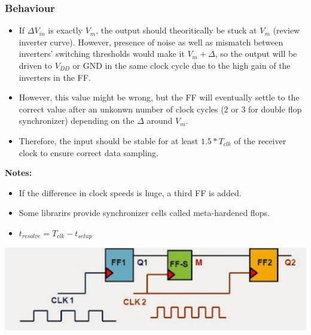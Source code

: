 \documentclass[11pt]{article}
\begin{document}
\subsubsection*{Behaviour}
\begin{itemize}
    \item If $\Delta V_{in}$ is exactly $V_m$, the output should theoritically be stuck at $V_m$ (review inverter curve). However, presence of noise as well as mismatch between inverters' switching thresholds would make it $V_m + \Delta$, so the output will be driven to $V_{DD}$ or GND in the same clock cycle due to the high gain of the inverters in the FF.
    \item However, this value might be wrong, but the FF will eventually settle to the correct value after an unkonwn number of clock cycles (2 or 3 for double flop synchronizer) depending on the $\Delta$ around $V_m$.
    \item Therefore, the input should be stable for at least $1.5*T_{clk}$ of the receiver clock to ensure correct data sampling.
\end{itemize}
\textbf{Notes:}
\begin{itemize}
    \item If the difference in clock speeds is huge, a third FF is added.
    \item Some librarirs provide synchronizer cells called meta-hardened flops.
    \item $t_{resolve}=T_{clk}-t_{setup}$
\end{itemize}

\begin{center}
    \includegraphics[scale=0.6]{2.png}
\end{center}
\end{document}
